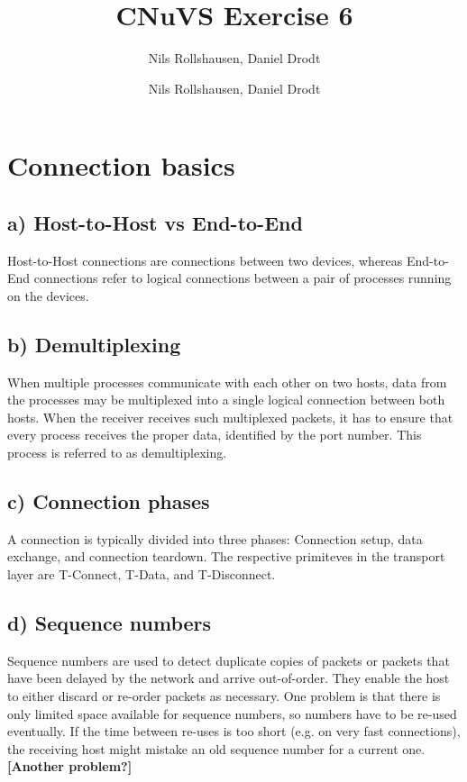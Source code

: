 \documentclass[a4paper, 11 pt, article, accentcolor=tud7b]{tudreport}
\title{CNuVS Exercise 6}
\author{Nils Rollshausen, Daniel Drodt}
\subtitle{Nils Rollshausen, Daniel Drodt}
\begin{document}
	\maketitle
	\section{Connection basics}
	\subsection*{a) Host-to-Host vs End-to-End}
	Host-to-Host connections are connections between two devices, whereas End-to-End connections refer to logical connections between a pair of processes running on the devices.
	  
	\subsection*{b) Demultiplexing}
	When multiple processes communicate with each other on two hosts, data from the processes may be multiplexed into a single logical connection between both hosts. When the receiver receives such multiplexed packets, it has to ensure that every process receives the proper data, identified by the port number. This process is referred to as demultiplexing.
	
	\subsection*{c) Connection phases}
	A connection is typically divided into three phases: Connection setup, data exchange, and connection teardown. The respective primiteves in the transport layer are T-Connect, T-Data, and T-Disconnect.
	
	\subsection*{d) Sequence numbers}
	Sequence numbers are used to detect duplicate copies of packets or packets that have been delayed by the network and arrive out-of-order. They enable the host to either discard or re-order packets as necessary. One problem is that there is only limited space available for sequence numbers, so numbers have to be re-used eventually. If the time between re-uses is too short (e.g. on very fast connections), the receiving host might mistake an old sequence number for a current one. \\
	\textbf{[Another problem?]}
	
\end{document}
